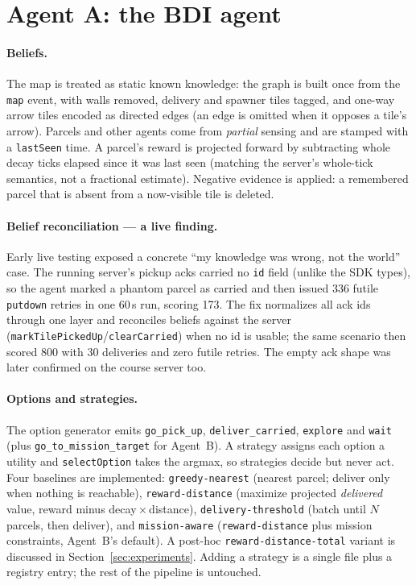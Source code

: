 \section{Agent A: the BDI agent}
\label{sec:bdi}

\paragraph{Beliefs.} The map is treated as static known knowledge: the graph is
built once from the \texttt{map} event, with walls removed, delivery and
spawner tiles tagged, and one-way arrow tiles encoded as directed edges (an
edge is omitted when it opposes a tile's arrow). Parcels and other agents come
from \emph{partial} sensing and are stamped with a \texttt{lastSeen} time. A
parcel's reward is projected forward by subtracting whole decay ticks elapsed
since it was last seen (matching the server's whole-tick semantics, not a
fractional estimate). Negative evidence is applied: a remembered parcel that is
absent from a now-visible tile is deleted.

\paragraph{Belief reconciliation --- a live finding.} Early live testing
exposed a concrete ``my knowledge was wrong, not the world'' case. The running
server's pickup acks carried no \texttt{id} field (unlike the SDK types), so the
agent marked a phantom parcel as carried and then issued 336 futile
\texttt{putdown} retries in one 60\,s run, scoring 173. The fix normalizes all
ack ids through one layer and reconciles beliefs against the server
(\texttt{markTilePickedUp}/\texttt{clearCarried}) when no id is usable; the same
scenario then scored 800 with 30 deliveries and zero futile retries. The empty
ack shape was later confirmed on the course server too.

\paragraph{Options and strategies.} The option generator emits
\texttt{go\_pick\_up}, \texttt{deliver\_carried}, \texttt{explore} and
\texttt{wait} (plus \texttt{go\_to\_mission\_target} for Agent~B). A strategy
assigns each option a utility and \texttt{selectOption} takes the argmax, so
strategies decide but never act. Four baselines are implemented:
\texttt{greedy-nearest} (nearest parcel; deliver only when nothing is
reachable), \texttt{reward-distance} (maximize projected \emph{delivered} value,
reward minus decay\,$\times$\,distance), \texttt{delivery-threshold} (batch
until $N$ parcels, then deliver), and \texttt{mission-aware}
(\texttt{reward-distance} plus mission constraints, Agent~B's default). A
post-hoc \texttt{reward-distance-total} variant is discussed in
Section~\ref{sec:experiments}. Adding a strategy is a single file plus a
registry entry; the rest of the pipeline is untouched.

